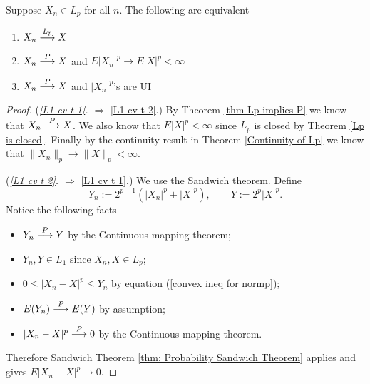 \begin{theorem}
Suppose $X_n\in L_p $ for all $n$. The following are equivalent
\begin{enumerate}
\item\label{L1 cv t 1} $X_n\overset{\small L_p} \longrightarrow X$
\item\label{L1 cv t 2} $X_n\overset{\small P} \longrightarrow X$ and $E|X_n|^p \rightarrow E|X|^p<\infty$
\item\label{L1 cv t 3} $X_n\overset{\small P} \longrightarrow X$ and $|X_n|^p$'s are UI
\end{enumerate}
\end{theorem}
\begin{proof}

({\sl \ref{L1 cv t 1}. $\Longrightarrow$} \ref{L1 cv t 2}.)
By Theorem \ref{thm Lp implies P} we know that $X_n\overset{\small P} \longrightarrow X$. 
We also know that $E|X|^p<\infty$ since $L_p$ is closed by Theorem \ref{Lp is closed}. 
Finally  by the continuity result in  Theorem \ref{Continuity of Lp}  we know that $\|X_n \|_p\rightarrow \| X \|_p<\infty$. 

({\sl \ref{L1 cv t 2}. $\Longrightarrow$} \ref{L1 cv t 1}.) We use the Sandwich theorem. Define
\[ Y_n:= 2^{p-1}(|X_n|^p + |X|^p),\qquad Y:= 2^p|X|^p.\] 
Notice the following facts
\begin{itemize}
\item $Y_n\overset{\small P} \longrightarrow Y$ by the Continuous mapping theorem;
\item  $Y_n, Y\in L_1$  since $X_n, X\in L_p$;
\item $0\leq |X_n-X|^p\leq Y_n$ by equation (\ref{convex ineq for normp});
\item $E(Y_n)\overset{\small P} \longrightarrow E(Y)$ by assumption;
\item $|X_n - X|^p\overset{\small P} \longrightarrow 0$ by the Continuous mapping theorem.
\end{itemize}
Therefore  Sandwich Theorem \ref{thm: Probability Sandwich Theorem}  applies and gives $E|X_n - X|^p\rightarrow 0$.




\end{proof}
